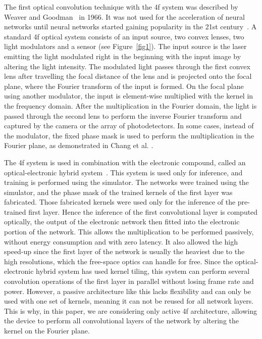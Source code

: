\documentclass{article}
\begin{document}
The first optical convolution technique with the 4f system was described by Weaver and Goodman~\cite{weaver_technique_1966} in 1966. It was not used for the acceleration of neural networks until neural networks started gaining popularity in the 21st century~\cite{jutamulia_overview_1996}. A standard 4f optical system consists of an input source, two convex lenses, two light modulators and a sensor (see Figure~\ref{fig1}). The input source is the laser emitting the light modulated right in the beginning with the input image by altering the light intensity. The modulated light passes through the first convex lens after travelling the focal distance of the lens and is projected onto the focal plane, where the Fourier transform of the input is formed. On the focal plane using another modulator, the input is element-wise multiplied with the kernel in the frequency domain. After the multiplication in the Fourier domain, the light is passed through the second lens to perform the inverse Fourier transform and captured by the camera or the array of photodetectors. In some cases, instead of the modulator, the fixed phase mask is used to perform the multiplication in the Fourier plane, as demonstrated in Chang et al. \cite{chang_hybrid_2018}. 

The 4f system is used in combination with the electronic compound, called an optical-electronic hybrid system~\cite{chang_hybrid_2018}. This system is used only for inference, and training is performed using the simulator. The networks were trained using the simulator, and the phase mask of the trained kernels of the first layer was fabricated. Those fabricated kernels were used only for the inference of the pre-trained first layer. Hence the inference of the first convolutional layer is computed optically, the output of the electronic network then fitted into the electronic portion of the network. This allows the multiplication to be performed passively, without energy consumption and with zero latency. It also allowed the high speed-up since the first layer of the network is usually the heaviest due to the high resolutions, which the free-space optics can handle for free. Since the optical-electronic hybrid system has used kernel tiling, this system can perform several convolution operations of the first layer in parallel without losing frame rate and power. However, a passive architecture like this lacks flexibility and can only be used with one set of kernels, meaning it can not be reused for all network layers. This is why, in this paper, we are considering only active 4f architecture, allowing the device to perform all convolutional layers of the network by altering the kernel on the Fourier plane. 
\end{document}
